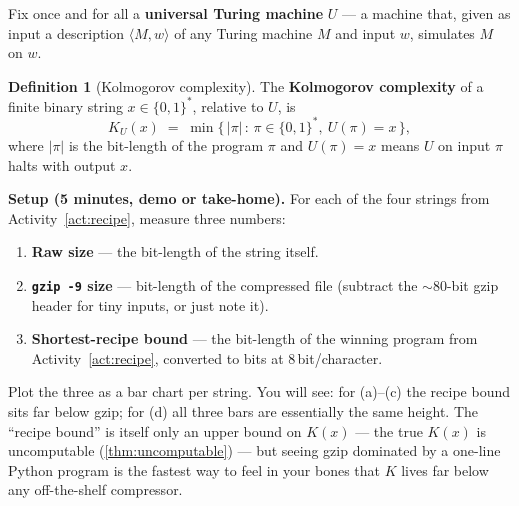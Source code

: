 \documentclass[12pt,a4paper]{article}
\theoremstyle{plain}
\theoremstyle{definition}
\newtheorem{definition}[theorem]{Definition}
\begin{document}
Fix once and for all a \textbf{universal Turing machine} $U$ --- a
machine that, given as input a description $\langle M, w\rangle$ of
any Turing machine $M$ and input $w$, simulates $M$ on $w$.

\begin{definition}[Kolmogorov complexity]
\label{def:kolmogorov}
The \textbf{Kolmogorov complexity} of a finite binary string
$x \in \{0,1\}^*$, relative to $U$, is
\begin{equation}
  K_U(x)
  \;=\; \min\bigl\{\, |\pi| \,:\, \pi \in \{0,1\}^*,\ U(\pi) = x \,\bigr\},
  \label{eq:kolmogorov}
\end{equation}
where $|\pi|$ is the bit-length of the program $\pi$ and $U(\pi) = x$
means $U$ on input $\pi$ halts with output $x$.
\end{definition}

\begin{activity}[title={Activity 2 --- The gzip-vs-$K$ scoreboard}]
\label{act:scoreboard}
\textbf{Setup (5 minutes, demo or take-home).}  For each of the four
strings from Activity~\ref{act:recipe}, measure three numbers:

\begin{enumerate}[label=(\roman*),leftmargin=*]
  \item \textbf{Raw size} --- the bit-length of the string itself.
  \item \textbf{\texttt{gzip -9} size} --- bit-length of the
        compressed file (subtract the $\sim\!80$-bit gzip header for
        tiny inputs, or just note it).
  \item \textbf{Shortest-recipe bound} --- the bit-length of the
        winning program from Activity~\ref{act:recipe}, converted to
        bits at $8$\,bit/character.
\end{enumerate}

Plot the three as a bar chart per string.  You will see: for (a)--(c)
the recipe bound sits far below gzip; for (d) all three bars are
essentially the same height.  The ``recipe bound'' is itself only an
upper bound on $K(x)$ --- the true $K(x)$ is uncomputable
(\cref{thm:uncomputable}) --- but seeing gzip dominated by a
one-line Python program is the fastest way to feel in your bones that
$K$ lives far below any off-the-shelf compressor.
\end{activity}
\end{document}
